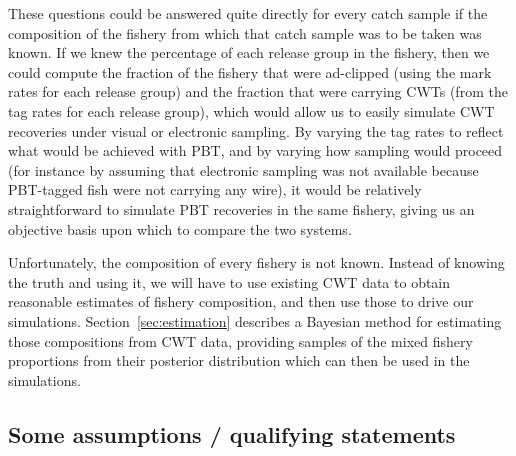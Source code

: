 \documentclass[11pt]{article}
\begin{document}
These questions could be answered quite directly for every catch sample if the composition of the
fishery from which that catch sample was to be taken was known.  If we knew the percentage of each
release group in the fishery, then we could compute the fraction of the fishery that were ad-clipped
(using the mark rates for each release group) and the fraction that were carrying CWTs (from the
tag rates for each release group), which would allow us to easily simulate CWT recoveries under
visual or electronic sampling.  By varying the tag rates to reflect what would be achieved with
PBT, and by varying how sampling would proceed (for instance by assuming that electronic sampling was not 
available because PBT-tagged fish were not carrying any wire), it would be
relatively straightforward to simulate PBT recoveries in the same fishery, giving us an objective basis upon which
to compare the two systems.  

Unfortunately, the composition of every fishery is not known.  Instead of knowing the truth
and using it, we will have to use existing CWT data to obtain reasonable estimates of
fishery composition, and then use those to drive our simulations. Section~\ref{sec:estimation} describes a Bayesian method for
estimating those compositions from CWT data, providing samples of the mixed fishery proportions
from their posterior distribution which can then be used in the simulations.  


\subsection{Some assumptions / qualifying statements}
\end{document}
